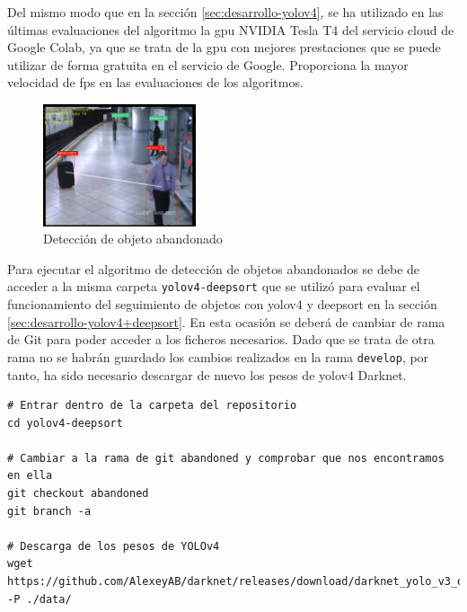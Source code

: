 Del mismo modo que en la sección \ref{sec:desarrollo-yolov4}, se ha utilizado en las últimas evaluaciones del algoritmo la \gls{gpu} NVIDIA Tesla T4 del servicio cloud de Google Colab, ya que se trata de la \gls{gpu} con mejores prestaciones que se puede utilizar de forma gratuita en el servicio de Google. Proporciona la mayor velocidad de \gls{fps} en las evaluaciones de los algoritmos.

\begin{figure}[ht]
\centering
\includegraphics[width=0.4\textwidth]{img/chapters/desarrollo/abandono-objeto-avss.jpg}
\caption{\label{fig:abandono-objeto-avss}Detección de objeto abandonado \cite{AVSSAB2007-dataset}}
\end{figure}

Para ejecutar el algoritmo de detección de objetos abandonados se debe de acceder a la misma carpeta \texttt{yolov4-deepsort} que se utilizó para evaluar el funcionamiento del seguimiento de objetos con \gls{yolov4} y \gls{deepsort} en la sección \ref{sec:desarrollo-yolov4+deepsort}. En esta ocasión se deberá de cambiar de rama de Git para poder acceder a los ficheros necesarios. Dado que se trata de otra rama no se habrán guardado los cambios realizados en la rama \texttt{develop}, por tanto, ha sido necesario descargar de nuevo los pesos de \gls{yolov4} Darknet.

\vspace{0.5cm}
\begin{lstlisting}[language=iPython,caption=Evaluación de la detección de objetos abandonados con DeepSORT y YOLOv4 en Tensorflow (1),captionpos=b,label={lst:evaluate-abandoned-object1}]
# Entrar dentro de la carpeta del repositorio
cd yolov4-deepsort

# Cambiar a la rama de git abandoned y comprobar que nos encontramos en ella
git checkout abandoned
git branch -a

# Descarga de los pesos de YOLOv4
wget https://github.com/AlexeyAB/darknet/releases/download/darknet_yolo_v3_optimal/yolov4.weights -P ./data/
\end{lstlisting}

